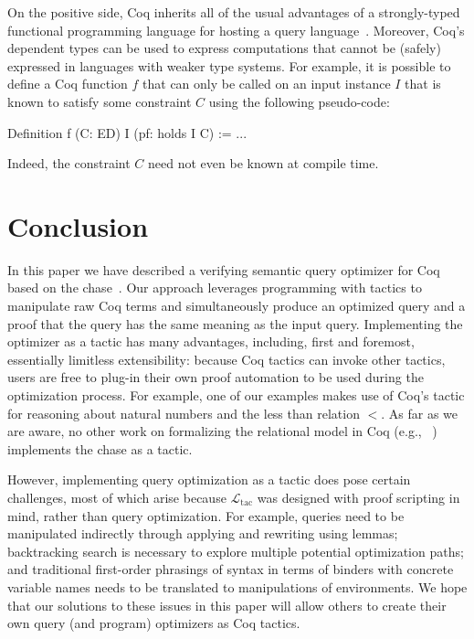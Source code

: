 \documentclass[preprint]{sigplanconf}
\newcommand{\ltac}[0]{\ensuremath{\mathcal{L}_{\mathrm{tac}}}}
\begin{document}
On the positive side, Coq inherits all of the usual advantages of a strongly-typed functional programming language for hosting a query language~\cite{monad}.  Moreover, Coq's dependent types can be used to express computations that cannot be (safely) expressed in languages with weaker type systems.  For example, it is possible to define a Coq function $f$ that can only be called on an input instance $I$ that is known to satisfy some constraint $C$ using the following pseudo-code:
\begin{coq}
Definition f (C: ED) I (pf: holds I C) := ...
\end{coq}
Indeed, the constraint $C$ need not even be known at compile time.  
\section{Conclusion}

In this paper we have described a verifying semantic query optimizer for Coq based on the chase~\cite{Deutsch:2006:QRC:1121995.1122010}.  Our approach leverages programming with tactics to manipulate raw Coq terms and simultaneously produce an optimized query and a proof that the query has the same meaning as the input query.  Implementing the optimizer as a tactic has many advantages, including, first and foremost, essentially limitless extensibility: because Coq tactics can invoke other tactics, users are free to plug-in their own proof automation to be used during the optimization process.  For example, one of our examples makes use of Coq's  tactic for reasoning about natural numbers and the less than relation $<$.   As far as we are aware, no other work on formalizing the relational model in Coq (e.g., ~\cite{coqdb}) implements the chase as a tactic.

However, implementing query optimization as a tactic does pose certain challenges, most of which arise because \ltac{} was designed with proof scripting in mind, rather than query optimization.
For example, queries need to be manipulated indirectly through applying and rewriting using lemmas; backtracking search is necessary to explore multiple potential optimization paths; and traditional first-order phrasings of syntax in terms of binders with concrete variable names needs to be translated to manipulations of environments.  We hope that our solutions to these issues in this paper will allow others to create their own query (and program) optimizers as Coq tactics.
\end{document}
